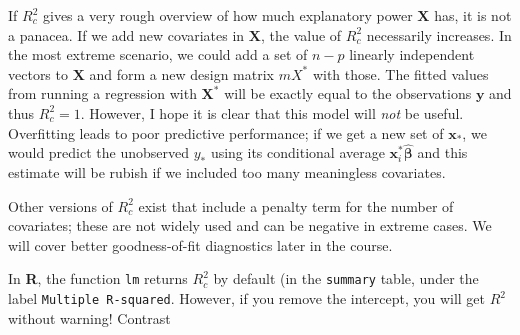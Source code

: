 \documentclass[]{book}
\newenvironment{Shaded}{\begin{snugshade}}{\end{snugshade}}
\newcommand{\CommentTok}[1]{\textcolor[rgb]{0.56,0.35,0.01}{\textit{#1}}}
\newcommand{\DataTypeTok}[1]{\textcolor[rgb]{0.13,0.29,0.53}{#1}}
\newcommand{\DecValTok}[1]{\textcolor[rgb]{0.00,0.00,0.81}{#1}}
\newcommand{\KeywordTok}[1]{\textcolor[rgb]{0.13,0.29,0.53}{\textbf{#1}}}
\newcommand{\NormalTok}[1]{#1}
\newcommand{\OperatorTok}[1]{\textcolor[rgb]{0.81,0.36,0.00}{\textbf{#1}}}
\newcommand{\StringTok}[1]{\textcolor[rgb]{0.31,0.60,0.02}{#1}}
\theoremstyle{definition}
\theoremstyle{definition}
\theoremstyle{definition}
\theoremstyle{remark}
\let\BeginKnitrBlock\begin \let\EndKnitrBlock\end
\begin{document}
If \(R^2_c\) gives a very rough overview of how much explanatory power
\(\mathbf{X}\) has, it is not a panacea. If we add new covariates in
\(\mathbf{X}\), the value of \(R^2_c\) necessarily increases. In the
most extreme scenario, we could add a set of \(n-p\) linearly
independent vectors to \(\mathbf{X}\) and form a new design matrix
\(mX^*\) with those. The fitted values from running a regression with
\(\mathbf{X}^*\) will be exactly equal to the observations
\(\boldsymbol{y}\) and thus \(R^2_c=1\). However, I hope it is clear
that this model will \emph{not} be useful. Overfitting leads to poor
predictive performance; if we get a new set of \(\mathbf{x}_*\), we
would predict the unobserved \(y_*\) using its conditional average
\(\mathbf{x}_i^*\hat{\boldsymbol{\beta}}\) and this estimate will be
rubish if we included too many meaningless covariates.

Other versions of \(R^2_c\) exist that include a penalty term for the
number of covariates; these are not widely used and can be negative in
extreme cases. We will cover better goodness-of-fit diagnostics later in
the course.

\BeginKnitrBlock{rmdcaution}
In \textbf{R}, the function \texttt{lm} returns \(R^2_c\) by default (in
the \texttt{summary} table, under the label
\texttt{Multiple\ R-squared}. However, if you remove the intercept, you
will get \(R^2\) without warning! Contrast
\EndKnitrBlock{rmdcaution}

\begin{Shaded}
\end{Shaded}
\end{document}
